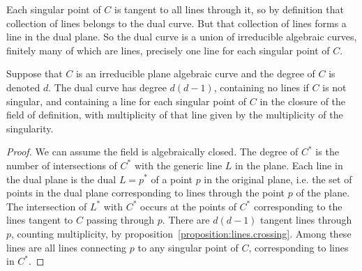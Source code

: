 Each singular point of \(C\) is tangent to all lines through it, so by definition that collection of lines belongs to the dual curve.
But that collection of lines forms a line in the dual plane.
So the dual curve is a union of irreducible algebraic curves, finitely many of which are lines, precisely one line for each singular point of \(C\).

\begin{proposition}
Suppose that \(C\) is an irreducible plane algebraic curve and the degree of \(C\) is denoted \(d\).
The dual curve has degree \(d(d-1)\), containing no lines if \(C\) is not singular, and containing a line for each singular point of \(C\) in the closure of the field of definition, with multiplicity of that line given by the multiplicity of the singularity.
\end{proposition}
\begin{proof}
We can assume the field is algebraically closed.
The degree of \(C^*\) is the number of intersections of \(C^*\) with the generic line \(L\) in the plane.
Each line in the dual plane is the dual \(L=p^*\) of a point \(p\) in the original plane, i.e. the set of points in the dual plane corresponding to lines through the point \(p\) of the plane.
The intersection of \(L^*\) with \(C^*\) occurs at the points of \(C^*\) corresponding to the lines tangent to \(C\) passing through \(p\).
There are \(d(d-1)\) tangent lines through \(p\), counting multiplicity, by proposition~\vref{proposition:lines.crossing}.
Among these lines are all lines connecting \(p\) to any singular point of \(C\), corresponding to lines in \(C^*\).
\end{proof}